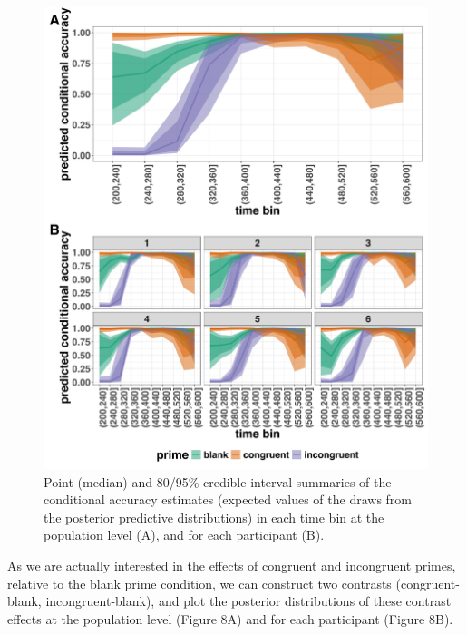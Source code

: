 \documentclass[
  man, donotrepeattitle,floatsintext]{apa6}
\begin{document}
\begin{figure}[H]

{\centering \includegraphics[width=0.8\linewidth,height=0.67\textheight,]{../Tutorial_2_Bayesian/figures/M1i_ca_pred_combined} 

}

\caption{Point (median) and 80/95\% credible interval summaries of the conditional accuracy estimates (expected values of the draws from the posterior predictive distributions) in each time bin at the population level (A), and for each participant (B).}\label{fig:plot-pred-grand-effects-ca}
\end{figure}

As we are actually interested in the effects of congruent and incongruent primes, relative to the blank prime condition, we can construct two contrasts (congruent-blank, incongruent-blank), and plot the posterior distributions of these contrast effects at the population level (Figure 8A) and for each participant (Figure 8B).
\end{document}
